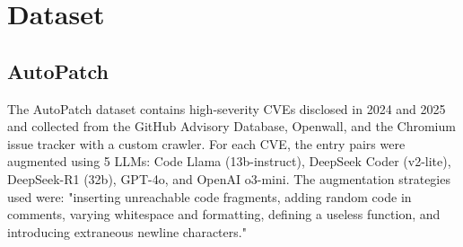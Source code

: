 \chapter{Dataset}\label{chapter:dataset}

\section{AutoPatch}
The AutoPatch dataset contains high-severity CVEs disclosed in 2024 and 2025 and collected from the GitHub Advisory Database, Openwall, and the Chromium issue tracker with a custom crawler.
For each CVE, the entry pairs were augmented using 5 LLMs:  Code Llama (13b-instruct), DeepSeek Coder (v2-lite), DeepSeek-R1 (32b), GPT-4o, and OpenAI o3-mini.
The augmentation strategies used were: "inserting unreachable code fragments, adding random code in comments, varying whitespace and formatting, defining a useless function, and introducing extraneous newline characters."


